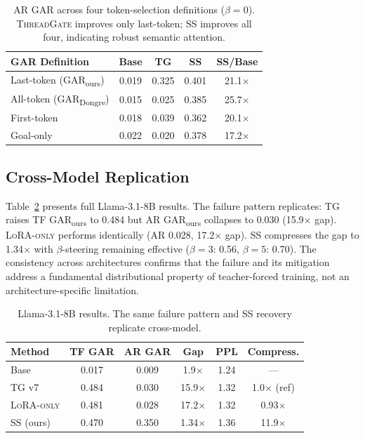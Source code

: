 \documentclass[11pt]{article}
\newcommand{\gar}{\textsc{GAR}}
\newcommand{\garours}{\textsc{GAR}\textsubscript{ours}}
\newcommand{\gardongre}{\textsc{GAR}\textsubscript{Dongre}}
\newcommand{\tg}{\textsc{ThreadGate}}
\newcommand{\lo}{\textsc{LoRA-only}}
\begin{document}
\begin{table}[t]
\centering
\small
\caption{AR \gar{} across four token-selection definitions ($\beta=0$). \tg{} improves only last-token; SS improves all four, indicating robust semantic attention.}
\label{tab:alt_gar}
\begin{tabular}{lcccc}
\toprule
\textbf{GAR Definition} & \textbf{Base} & \textbf{TG} & \textbf{SS} & \textbf{SS/Base} \\
\midrule
Last-token (\garours{}) & 0.019 & 0.325 & 0.401 & 21.1$\times$ \\
All-token (\gardongre{}) & 0.015 & 0.025 & 0.385 & 25.7$\times$ \\
First-token & 0.018 & 0.039 & 0.362 & 20.1$\times$ \\
Goal-only & 0.022 & 0.020 & 0.378 & 17.2$\times$ \\
\bottomrule
\end{tabular}
\end{table}

\subsection{Cross-Model Replication}

Table~\ref{tab:llama} presents full Llama-3.1-8B results. The failure pattern replicates: TG raises TF \garours{} to 0.484 but AR \garours{} collapses to 0.030 (15.9$\times$ gap). \lo{} performs identically (AR 0.028, 17.2$\times$ gap). SS compresses the gap to 1.34$\times$ with $\beta$-steering remaining effective ($\beta=3$: 0.56, $\beta=5$: 0.70). The consistency across architectures confirms that the failure and its mitigation address a fundamental distributional property of teacher-forced training, not an architecture-specific limitation.

\begin{table}[t]
\centering
\small
\caption{Llama-3.1-8B results. The same failure pattern and SS recovery replicate cross-model.}
\label{tab:llama}
\begin{tabular}{lccccc}
\toprule
\textbf{Method} & \textbf{TF \gar{}} & \textbf{AR \gar{}} & \textbf{Gap} & \textbf{PPL} & \textbf{Compress.} \\
\midrule
Base & 0.017 & 0.009 & 1.9$\times$ & 1.24 & --- \\
TG v7 & 0.484 & 0.030 & 15.9$\times$ & 1.32 & 1.0$\times$ (ref) \\
\lo{} & 0.481 & 0.028 & 17.2$\times$ & 1.32 & 0.93$\times$ \\
SS (ours) & 0.470 & 0.350 & 1.34$\times$ & 1.36 & 11.9$\times$ \\
\bottomrule
\end{tabular}
\end{table}
\end{document}
